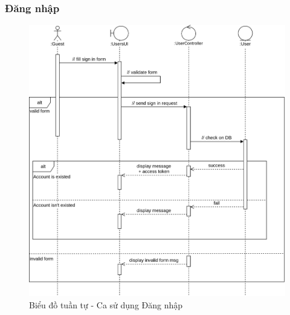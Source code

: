 \documentclass[./../main.tex]{subfiles}
\begin{document}
\subsubsection{Đăng nhập}
\begin{figure}[H]
	\centering
	\includegraphics[width=\linewidth]{./img/uc2.png}
	\caption{Biểu đồ tuần tự - Ca sử dụng Đăng nhập}
\end{figure}
\end{document}
